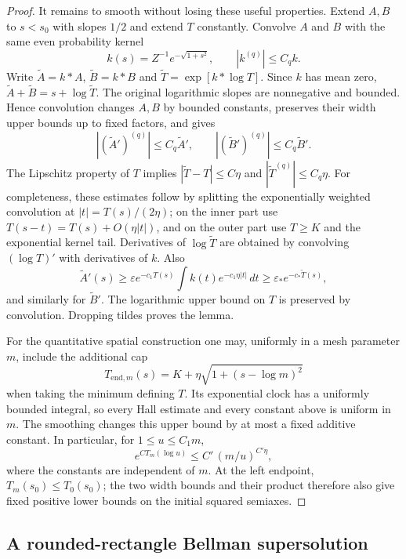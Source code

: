 \documentclass[11pt]{article}
\numberwithin{equation}{section}
\begin{document}
\begin{proof}
It remains to smooth without losing these useful properties. Extend
$A,B$ to $s<s_0$ with slopes $1/2$ and extend $T$ constantly. Convolve
$A$ and $B$ with the same even probability kernel
\[
 k(s)=Z^{-1}e^{-\sqrt{1+s^2}},
 \qquad |k^{(q)}|\le C_q k.
\]
Write $\widetilde A=k*A$, $\widetilde B=k*B$ and
$\widetilde T=\exp[k*\log T]$. Since $k$ has mean zero,
$\widetilde A+\widetilde B=s+\log\widetilde T$.
The original logarithmic slopes are nonnegative and bounded. Hence
convolution changes $A,B$ by bounded constants, preserves their width
upper bounds up to fixed factors, and gives
\[
 |(\widetilde A')^{(q)}|\le C_q\widetilde A',\qquad
 |(\widetilde B')^{(q)}|\le C_q\widetilde B'.
\]
The Lipschitz property of $T$ implies
$|\widetilde T-T|\le C\eta$ and
$|\widetilde T^{(q)}|\le C_q\eta$.
For completeness, these estimates follow by splitting the exponentially
weighted convolution at $|t|=T(s)/(2\eta)$; on the inner part use
$T(s-t)=T(s)+O(\eta|t|)$, and on the outer part use $T\ge K$ and the
exponential kernel tail. Derivatives of $\log\widetilde T$ are obtained
by convolving $(\log T)'$ with derivatives of $k$.
Also
\[
 \widetilde A'(s)\ge
 \varepsilon e^{-c_1T(s)}\int k(t)e^{-c_1\eta|t|}\,dt
 \ge\varepsilon_*e^{-c_*\widetilde T(s)},
\]
and similarly for $\widetilde B'$. The logarithmic upper bound on $T$
is preserved by convolution. Dropping tildes proves the lemma.

For the quantitative spatial construction one may, uniformly in a mesh
parameter $m$, include the additional cap
\[
 T_{\mathrm{end},m}(s)=K+\eta\sqrt{1+(s-\log m)^2}
\]
when taking the minimum defining $T$. Its exponential clock has a
uniformly bounded integral, so every Hall estimate and every constant
above is uniform in $m$. The smoothing changes this upper bound by at
most a fixed additive constant. In particular, for $1\le u\le C_1m$,
\begin{equation}\label{pair:eq:mesh-adapted-clock}
 e^{C T_m(\log u)}\le C'\,(m/u)^{C'\eta},
\end{equation}
where the constants are independent of $m$. At the left endpoint,
$T_m(s_0)\le T_0(s_0)$; the two width bounds and their product therefore
also give fixed positive lower bounds on the initial squared semiaxes.
\end{proof}



\subsection{A rounded-rectangle Bellman supersolution}
\label{pair:sec:rounded-phase}
\end{document}
